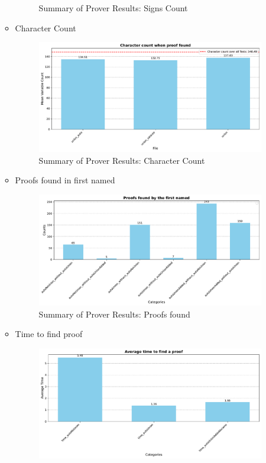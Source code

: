 \documentclass[german,version-2020-11]{uzl-thesis}
\begin{document}
\begin{itemize}
\begin{itemize}
\begin{figure}[h!]
          \caption{Summary of Prover Results: Signs Count}
          \label{fig:prover_results_vampire}
        \end{figure}
        \clearpage
        \item Character Count
        \begin{figure}[h!]
          \centering
          \includegraphics[width=\textwidth]{character_count.pdf} %
          \caption{Summary of Prover Results: Character Count}
          \label{fig:prover_results_vampire}
        \end{figure}
        \clearpage
        \item Proofs found in first named
        \begin{figure}[h!]
          \centering
          \includegraphics[width=\textwidth]{proof_found_difference.pdf} %
          \caption{Summary of Prover Results: Proofs found}
          \label{fig:prover_results_proof_found}
        \end{figure}
        \clearpage
        \item Time to find proof
        \begin{figure}[h!]
          \centering
          \includegraphics[width=\textwidth]{time_to_find_proof.pdf} %

\end{figure}
\end{itemize}
\end{itemize}
\end{document}
